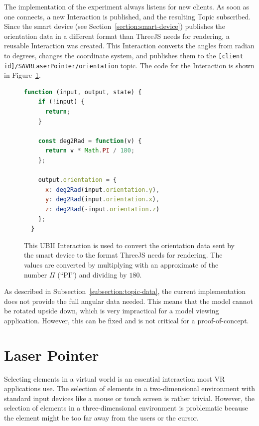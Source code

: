 The implementation of the experiment always listens for new clients. As soon as one connects, a new Interaction is published, and the resulting Topic subscribed. Since the smart device (see Section~\ref{section:smart-device}) publishes the orientation data in a different format than ThreeJS needs for rendering, a reusable Interaction was created. This Interaction converts the angles from radian to degrees, changes the coordinate system, and publishes them to the \lstinline[breaklines=true]{[client id]/SAVRLaserPointer/orientation} topic. The code for the Interaction is shown in Figure~\ref{fig:ubii-interaction-angles}.

\begin{figure}[H]
	\begin{lstlisting}[language=JavaScript]
  function (input, output, state) {
    if (!input) {
      return;
    }

    const deg2Rad = function(v) {
      return v * Math.PI / 180;
    };

    output.orientation = {
      x: deg2Rad(input.orientation.y),
      y: deg2Rad(input.orientation.x),
      z: deg2Rad(-input.orientation.z)
    };
  }
 \end{lstlisting}
	\caption[A UBII Interaction of model viewer]{This \gls{UBII} Interaction is used to convert the orientation data sent by the smart device to the format ThreeJS needs for rendering. The values are converted by multiplying with an approximate of the number $\Pi$ (\enquote{PI}) and dividing by $180$.}\label{fig:ubii-interaction-angles} %
\end{figure}

As described in Subsection~\ref{subsection:topic-data}, the current implementation does not provide the full angular data needed. This means that the model cannot be rotated upside down, which is very impractical for a model viewing application. However, this can be fixed and is not critical for a proof-of-concept.


\section{Laser Pointer}\label{section:laser-pointer}

Selecting elements in a virtual world is an essential interaction most \gls{VR} applications use. The selection of elements in a two-dimensional environment with standard input devices like a mouse or touch screen is rather trivial. However, the selection of elements in a three-dimensional environment is problematic because the element might be too far away from the users or the cursor.

